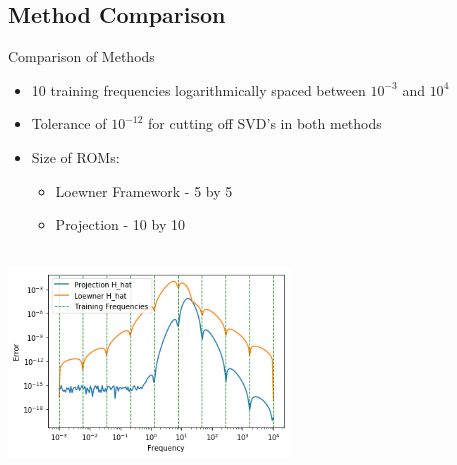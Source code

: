 \subsection{Method Comparison}

\begin{frame}{Comparison of Methods}
\begin{itemize}
\item 10 training frequencies logarithmically spaced between $10^{-3}$ and $10^4$\\
\item Tolerance of $10^{-12}$ for cutting off SVD's
in both methods\\
\bigskip
\item Size of ROMs: \\
\begin{itemize}
    \item Loewner Framework - 5 by 5
    \item Projection - 10 by 10
\end{itemize}
\end{itemize}

\centering
\includegraphics[width=7.5cm, height= 6cm]{comparison0.png}

\end{frame}
